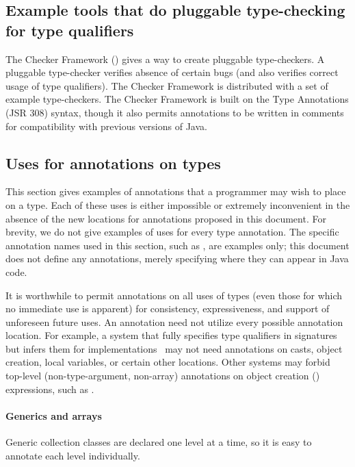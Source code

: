 \documentclass[10pt]{article}
\begin{document}
\subsection{Example tools that do pluggable type-checking for type qualifiers\label{type-qualifier-tools}}

The Checker Framework
()
gives a way to create pluggable type-checkers.  A pluggable type-checker
verifies absence of certain bugs (and also verifies correct usage of type
qualifiers).  The Checker Framework is distributed with a set of example
type-checkers.  The Checker Framework is built on the Type Annotations (JSR
308) syntax, though it also permits annotations to be written in comments
for compatibility with previous versions of Java.


\subsection{Uses for annotations on types\label{type-annotation-use-cases}}

This section gives examples of annotations that a programmer may wish to
place on a type.
Each of these uses is either impossible or extremely inconvenient in the
absence of the new locations for annotations proposed in this document.
For brevity, we do not give examples of uses for every type annotation.
The specific annotation names used in this
section, such as , are examples only; this document does not
define any annotations, merely specifying where they can appear in Java
code.


It is worthwhile to permit annotations on all uses of types (even those for
which no immediate use is apparent) for consistency, expressiveness, and
support of unforeseen future uses.
%
An annotation need not utilize every
possible annotation location.  For example, a system that fully specifies
type qualifiers in signatures but infers them for implementations~\cite{GreenfieldboyceF2005}
may not need annotations on casts, object creation, local variables, or
certain other locations.  Other
systems may forbid top-level (non-type-argument, non-array) annotations
on object creation () expressions, such as .


\paragraph{Generics and arrays\label{generics-and-arrays}}
Generic collection classes are
declared one level at a time, so it is easy to annotate each level
individually.
\end{document}
